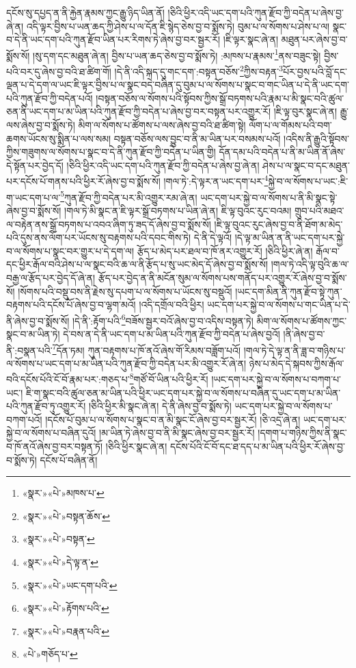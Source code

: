 དངོས་སུ་དཔྱད་ན་ནི་རྐྱེན་རྣམས་ཀྱང་རྒྱུ་ཉིད་ཡིན་ནོ། །ཅིའི་ཕྱིར་འདི་ཡང་དག་པའི་ཀུན་རྫོབ་ཀྱི་བདེན་པ་ཞེས་བྱ་ཞེ་ན། འདི་ལྟར་བྱིས་པ་ཡན་ཆད་ཀྱི་ཤེས་པ་ལ་དོན་ཇི་སྙེད་ཅེས་བྱ་བ་སྨོས་ཏེ། བུམ་པ་ལ་སོགས་པ་ཤེས་པ་ལ། སྣང་བ་དེ་ནི་ཡང་དག་པའི་ཀུན་རྫོབ་ཡིན་པར་རིགས་ཏེ་ཞེས་བྱ་བར་སྦྱར་རོ། །ཇི་ལྟར་སྣང་ཞེ་ན། མཐུན་པར་ཞེས་བྱ་བ་སྨོས་སོ། །སུ་དག་དང་མཐུན་ཞེ་ན། བྱིས་པ་ཡན་ཆད་ཅེས་བྱ་བ་སྨོས་ཏེ། :མཁས་པ་རྣམས་\footnote{«སྣར་»«པེ་»མཁས་པ་}ནས་བཟུང་སྟེ། བྱིས་པའི་བར་དུ་ཞེས་བྱ་བའི་ཐ་ཚིག་གོ། །དེ་ནི་འདི་སྐད་དུ་གང་དག་:བསྟན་བཅོས་\footnote{«སྣར་»«པེ་»བསྟན་ཆོས་}ཀྱིས་བརྟན་\footnote{«སྣར་»«པེ་»བསྟན་}པོར་བྱས་པའི་བློ་དང་ལྡན་པ་དེ་དག་ལ་ཡང་ཇི་ལྟར་བྱིས་པ་ལ་སྣང་བདེ་བཞིན་དུ་བུམ་པ་ལ་སོགས་པ་སྣང་བ་གང་ཡིན་པ་དེ་ནི་ཡང་དག་པའི་ཀུན་རྫོབ་ཀྱི་བདེན་པའོ། །བསྟན་བཅོས་ལ་སོགས་པའི་སྟོབས་ཀྱིས་སྒྲོ་བཏགས་པའི་རྣམ་པ་མི་སྣང་བའི་ཚུལ་ཅན་ནི་ཡང་དག་པ་མ་ཡིན་པའི་ཀུན་རྫོབ་ཀྱི་བདེན་པ་ཞེས་བྱ་བར་བསྟན་པར་འགྱུར་རོ། །ཇི་ལྟ་བུར་སྣང་ཞེ་ན། རྒྱུ་ལས་ཞེས་བྱ་བ་སྨོས་ཏེ། མིག་ལ་སོགས་པ་ཚོགས་པ་ལས་ཞེས་བྱ་བའི་ཐ་ཚིག་སྟེ། ལོག་པ་ལ་གོམས་པའི་བག་ཆགས་ཡོངས་སུ་སྨིན་པ་ལས་སམ། བསྟན་བཅོས་ལས་བྱུང་བ་ནི་མ་ཡིན་པར་བསམས་པའོ། །འདིས་ནི་རྒྱུའི་སྟོབས་ཀྱིས་གཟུགས་ལ་སོགས་པ་སྣང་བ་དེ་ནི་ཀུན་རྫོབ་ཀྱི་བདེན་པ་ཡིན་གྱི། དོན་དམ་པའི་བདེན་པ་ནི་མ་ཡིན་ནོ་ཞེས་དེ་སྟོན་པར་བྱེད་དོ། །ཅིའི་ཕྱིར་འདི་ཡང་དག་པའི་ཀུན་རྫོབ་ཀྱི་བདེན་པ་ཞེས་བྱ་ཞེ་ན། ཤེས་པ་ལ་སྣང་བ་དང་མཐུན་པར་དངོས་པོ་གནས་པའི་ཕྱིར་རོ་ཞེས་བྱ་བ་སྨོས་སོ། །གལ་ཏེ་:དེ་ལྟར་ན་ཡང་དག་པར་\footnote{«སྣར་»«པེ་»དེ་ལྟ་ན་}སྐྱེ་བ་ལ་སོགས་པ་ཡང་:ཇི་ག་ཡང་དག་པ་ལ་\footnote{«སྣར་»«པེ་»ཡང་དག་པའི་}ཀུན་རྫོབ་ཀྱི་བདེན་པར་མི་འགྱུར་རམ་ཞེ་ན། ཡང་དག་པར་སྐྱེ་བ་ལ་སོགས་པ་ནི་མི་སྣང་སྟེ་ཞེས་བྱ་བ་སྨོས་སོ། །གལ་ཏེ་མི་སྣང་ན་ཇི་ལྟར་སྒྲོ་བཏགས་པ་ཡིན་ཞེ་ན། ཇི་ལྟ་བུའང་རུང་བའམ། གྲུབ་པའི་མཐའ་ལ་བརྟེན་ནས་སྒྲོ་བཏགས་པ་འབའ་ཞིག་ཏུ་ཟད་དོ་ཞེས་བྱ་བ་སྨོས་སོ། །ཇི་ལྟ་བུའང་རུང་ཞེས་བྱ་བ་ནི་ཐོག་མ་མེད་པའི་དུས་ནས་ལོག་པར་ཡོངས་སུ་བརྟགས་པའི་དབང་གིས་ཏེ། དེ་ནི་དེ་ལྟའོ། །དེ་ལྟ་མ་ཡིན་ན་ནི་ཡང་དག་པར་སྐྱེ་བ་ལ་སོགས་པ་སྣང་བར་གྱུར་པ་དེ་དག་ལ། རྩོད་པ་མེད་པར་ཐལ་བ་ཁོ་ནར་འགྱུར་རོ། །ཅིའི་ཕྱིར་ཞེ་ན། རྒོལ་བ་དང་ཕྱིར་རྒོལ་བའི་ཤེས་པ་ལ་སྣང་བའི་ཆ་ལ་ནི་རྩོད་པ་སུ་ཡང་མེད་དོ་ཞེས་བྱ་བ་སྨོས་སོ། །གལ་ཏེ་འདི་ལྟ་བུའི་ཆ་ལ་བརྒྱ་ལ་རྩོད་པར་བྱེད་དོ་ཞེ་ན། རྩོད་པར་བྱེད་ན་ནི་མངོན་སུམ་ལ་སོགས་པས་གནོད་པར་འགྱུར་རོ་ཞེས་བྱ་བ་སྨོས་སོ། །སོགས་པའི་བསྡུ་བས་ནི་རྗེས་སུ་དཔག་པ་ལ་སོགས་པ་ཡོངས་སུ་བསྡུའོ། །ཡང་དག་མིན་ནི་ཀུན་རྫོབ་སྟེ་ཀུན་བརྟགས་པའི་དངོས་པོ་ཞེས་བྱ་བ་ལྷག་མའོ། །འདི་དགྲོལ་བའི་ཕྱིར། ཡང་དག་པར་སྐྱེ་བ་ལ་སོགས་པ་གང་ཡིན་པ་དེ་ནི་ཞེས་བྱ་བ་སྨོས་སོ། །དེ་ནི་:རྟོག་པའི་\footnote{«སྣར་»«པེ་»རྟོགས་པའི་}བཟོས་སྦྱར་བའོ་ཞེས་བྱ་བ་འདིས་བསྟན་ཏེ། མིག་ལ་སོགས་པ་ཚོགས་ཀྱང་སྣང་བ་མ་ཡིན་ཏེ། དེ་བས་ན་དེ་ནི་ཡང་དག་པ་མ་ཡིན་པའི་ཀུན་རྫོབ་ཀྱི་བདེན་པ་ཞེས་བྱའོ། །ནི་ཞེས་བྱ་བ་ནི་:བསྣན་པའི་\footnote{«སྣར་»«པེ་»བརྣན་པའི་}དོན་ཏམ། ཀུན་བརྟགས་པ་ཁོ་ནའོ་ཞེས་གོ་རིམས་བཟློག་པའོ། །གལ་ཏེ་དེ་ལྟ་ན་ནི་ཟླ་བ་གཉིས་པ་ལ་སོགས་པ་ཡང་དག་པ་མ་ཡིན་པའི་ཀུན་རྫོབ་ཀྱི་བདེན་པར་མི་འགྱུར་རོ་ཞེ་ན། ཉེས་པ་མེད་དེ་སྐབས་ཀྱིས་རྒོལ་བའི་དངོས་པོའི་ངོ་བོ་རྣམ་པར་:གཅད་པ་\footnote{«པེ་»གཅོད་པ་}གཙོ་བོ་ཡིན་པའི་ཕྱིར་རོ། །ཡང་དག་པར་སྐྱེ་བ་ལ་སོགས་པ་བཀག་པ་ཡང་། ཇི་ག་སྣང་བའི་ཚུལ་ཅན་མ་ཡིན་པའི་ཕྱིར་ཡང་དག་པར་སྐྱེ་བ་ལ་སོགས་པ་བཞིན་དུ་ཡང་དག་པ་མ་ཡིན་པའི་ཀུན་རྫོབ་ཏུ་འགྱུར་རོ། །ཅིའི་ཕྱིར་མི་སྣང་ཞེ་ན། དེ་ནི་ཞེས་བྱ་བ་སྨོས་ཏེ། ཡང་དག་པར་སྐྱེ་བ་ལ་སོགས་པ་བཀག་པའོ། །དངོས་པོ་བུམ་པ་ལ་སོགས་པ་སྣང་བ་ན་མི་སྣང་ངོ་ཞེས་བྱ་བར་སྦྱར་རོ། །ཅི་འདྲ་ཞེ་ན། ཡང་དག་པར་སྐྱེ་བ་ལ་སོགས་པ་བཞིན་དུའོ། །མ་ཡིན་ཏེ་ཞེས་བྱ་བ་ནི་མི་སྣང་ཞེས་བྱ་བར་སྦྱར་རོ། །དགག་པ་གཉིས་ཀྱིས་ནི་སྣང་བ་ཁོ་ནའོ་ཞེས་བྱ་བར་བསྟན་ཏོ། །ཅིའི་ཕྱིར་སྣང་ཞེ་ན། དངོས་པོའི་ངོ་བོ་དང་ཐ་དད་པ་མ་ཡིན་པའི་ཕྱིར་རོ་ཞེས་བྱ་བ་སྨོས་ཏེ། དངོས་པོ་བཞིན་ནོ། 